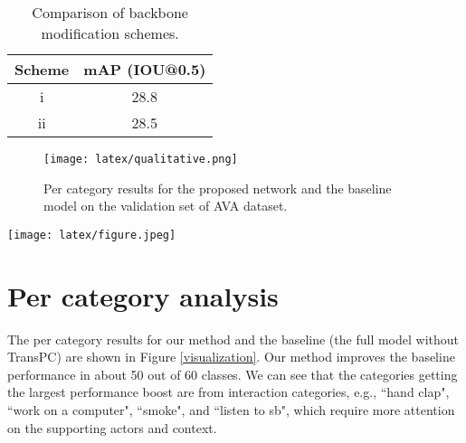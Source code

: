 \documentclass[review]{cvpr}
\begin{document}
\begin{table} [t]
\begin{center}
\small
\begin{tabular}{c|c}
\toprule
Scheme & mAP (IOU@0.5)  \\
\midrule
 i & 28.8 \\
 ii & 28.5 \\
\bottomrule
\end{tabular}
\end{center}
\vspace{-5mm}
\caption{Comparison of backbone modification schemes.}
\vspace{-3mm}
\label{backbone}
\end{table}

\begin{figure}[t]
\texttt{[image: latex/qualitative.png]}
\centering
\caption{Per category results for the proposed network and the baseline model on the validation set of AVA dataset.}
\label{qualitative}
\end{figure}

\begin{figure*}[!t]
\texttt{[image: latex/figure.jpeg]}
\centering
\caption{Per category results for the proposed network and the baseline model on the validation set of AVA dataset.}
\label{visualization}
\end{figure*}

\section{Per category analysis}
The per category results for our method and the baseline (the full model without TransPC) are shown in Figure \ref{visualization}. Our method improves the baseline performance in about 50 out of 60 classes. We can see that the categories getting the largest performance boost are from interaction categories, e.g., ``hand clap", ``work on a computer", ``smoke", and ``listen to sb", which require more attention on the supporting actors and context.





% 
\end{document}
